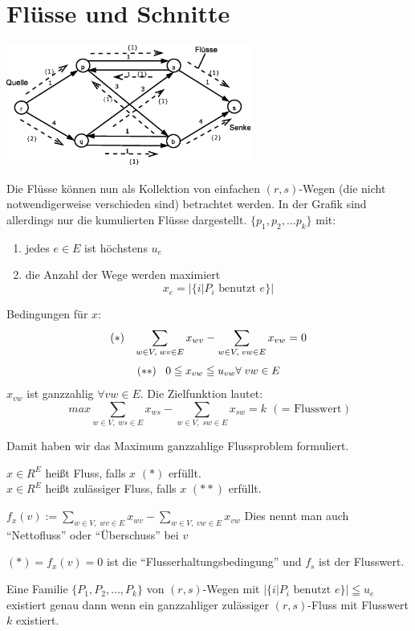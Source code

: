 
\section{Flüsse und Schnitte}

\includegraphics[height=4cm]{bilder/3-0Maxfluss}

Die Flüsse können nun als Kollektion von einfachen $(r,s)$-Wegen (die nicht
notwendigerweise verschieden sind) betrachtet werden. In der Grafik sind
allerdings nur die kumulierten Flüsse dargestellt. $\{ p_{1}, p_{2}, \ldots
p_{k} \}$ mit:
\begin{enumerate}
\item jedes $e \in E$ ist höchstens $u_{e}$
\item die Anzahl der Wege werden maximiert
\[ x_{e} = | \{ i | P_{i} \mbox{ benutzt } e\} |\]
\end{enumerate}
Bedingungen für $x$:\\
\[ (\ast) \hspace{3mm} \sum_{w \in V, \; w v \in E} x_{w v} - \sum_{w\in V,
\; v w \in E} x_{v w} = 0\]
\[(\ast \ast) \hspace{3mm} 0 \leqq x_{v w} \leqq u_{v w} \forall \; v w \in E\]
$x_{v w}$ ist ganzzahlig $\forall v w \in E$. Die Zielfunktion lautet:
\[ max \sum_{w \in V,\;  w s \in E} x_{w s} - \sum _{w \in V,\;   s w \in E}
x_{s w} = k \mbox{ ( $=$ Flusswert})\]

Damit haben wir das Maximum ganzzahlige Flussproblem formuliert.

$x \in R^{E}$ heißt Fluss, falls $x$ $(\ast)$ erfüllt.\\
$x \in R^{E}$ heißt zulässiger Fluss, falls $x$ $(\ast \ast)$ erfüllt.

$f_{x} (v) := \displaystyle \sum_{w \in V, \; w v \in E} x_{w v} -  \sum_{w \in V, \; v w
\in E} x_{v  w}$ Dies nennt man auch "`Nettofluss"' oder "`Überschuss"' bei
$v$

$(\ast)  = f_{x}(v) = 0 $ ist die "`Flusserhaltungsbedingung"' und $f_{s}$
ist der Flusswert.

\begin{lemma} \label{Familie}
Eine Familie $\{P_{1}, P_{2},\ldots, P_{k}\}$ von $(r,s)$-Wegen mit $|\{i |
P_{i} \mbox{ benutzt }e\}| \leqq u_{e}$ existiert genau dann wenn ein
ganzzahliger zulässiger $(r,s)$-Fluss mit Flusswert $k$ existiert.
\end{lemma}

